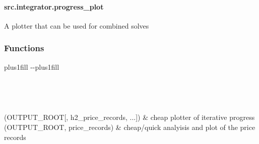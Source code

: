 \documentclass[letterpaper,10pt,english]{sphinxmanual}
\begin{document}
\sphinxstepscope


\paragraph{src.integrator.progress\_plot}
\label{\detokenize{src.integrator.progress_plot:module-src.integrator.progress_plot}}\label{\detokenize{src.integrator.progress_plot:src-integrator-progress-plot}}\label{\detokenize{src.integrator.progress_plot::doc}}
\sphinxAtStartPar
A plotter that can be used for combined solves
\subsubsection*{Functions}


\begin{savenotes}
\sphinxatlongtablestart
\sphinxthistablewithglobalstyle
\sphinxthistablewithnovlinesstyle
\makeatletter
  \LTleft \@totalleftmargin plus1fill
  \LTright\dimexpr\columnwidth-\@totalleftmargin-\linewidth\relax plus1fill
\makeatother
\begin{longtable}{}
\sphinxtoprule
\endfirsthead

\\
\sphinxtoprule
\endhead

\sphinxbottomrule
{}\\
\endfoot

\endlastfoot
\sphinxtableatstartofbodyhook

\sphinxAtStartPar
{\hyperref[\detokenize{src.integrator.progress_plot:src.integrator.progress_plot.plot_it}]{}}(OUTPUT\_ROOT{[}, h2\_price\_records, ...{]})
&
\sphinxAtStartPar
cheap plotter of iterative progress
\\
\sphinxhline
\sphinxAtStartPar
{\hyperref[\detokenize{src.integrator.progress_plot:src.integrator.progress_plot.plot_price_distro}]{}}(OUTPUT\_ROOT, price\_records)
&
\sphinxAtStartPar
cheap/quick analyisis and plot of the price records
\\
\sphinxbottomrule
\end{longtable}
\sphinxtableafterendhook
\sphinxatlongtableend
\end{savenotes}
\end{document}
